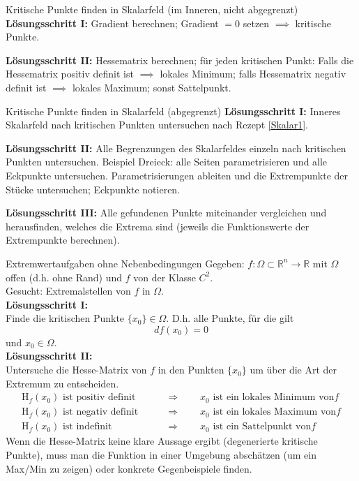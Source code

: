 \begin{Rezept}[label=Skalar1]{Kritische Punkte finden in Skalarfeld (im Inneren, nicht abgegrenzt)}{}
	\textbf{Lösungsschritt I:} Gradient berechnen; Gradient $=0$ setzen $\implies$ kritische Punkte.
	
	\textbf{Lösungsschritt II:} Hessematrix berechnen; für jeden kritischen Punkt: Falls die Hessematrix positiv definit ist $\implies$ lokales Minimum; falls Hessematrix negativ definit ist $\implies$ lokales Maximum; sonst Sattelpunkt.
\end{Rezept}

\begin{Rezept}[label=Skalar2]{Kritische Punkte finden in Skalarfeld (abgegrenzt)}{}
	\textbf{Lösungsschritt I:} Inneres Skalarfeld nach kritischen Punkten untersuchen nach Rezept \ref{Skalar1}.
	
	\textbf{Lösungsschritt II:} Alle Begrenzungen des Skalarfeldes einzeln nach kritischen Punkten untersuchen. Beispiel Dreieck: alle Seiten parametrisieren und alle Eckpunkte untersuchen. Parametrisierungen ableiten und die Extrempunkte der Stücke untersuchen; Eckpunkte notieren.
	
	\textbf{Lösungsschritt III:} Alle gefundenen Punkte miteinander vergleichen und herausfinden, welches die Extrema sind (jeweils die Funktionswerte der Extrempunkte berechnen).
\end{Rezept}

\begin{Rezept}[label=R1]{Extremwertaufgaben ohne Nebenbedingungen}{}
	Gegeben: $f:\Omega\subset \mathbb{R}^n \to \mathbb{R}$ mit $\Omega$ offen (d.h. ohne Rand) und $f$ von der Klasse $C^2$.\\
	Gesucht: Extremalstellen von $f$ in $\Omega$.\\
	\newline
	\textbf{Lösungsschritt I:}\\
	Finde die kritischen Punkte $\{x_0\} \in \Omega$. D.h. alle Punkte, für die gilt
	\begin{equation*}
	df(x_0)=0
	\end{equation*}
	und $x_0 \in \Omega$.\\
	\textbf{Lösungsschritt II:}\\
	Untersuche die Hesse-Matrix von $f$ in den Punkten $\{x_0\}$ um über die Art der Extremum zu entscheiden.
	\begin{align*}
	\text{H}_f(x_0) \text{ ist positiv definit} \qquad &\Rightarrow \qquad x_0 \text{ ist ein lokales Minimum von} f\\
	\text{H}_f(x_0) \text{ ist negativ definit} \qquad &\Rightarrow \qquad x_0 \text{ ist ein lokales Maximum von} f\\
	\text{H}_f(x_0) \text{ ist indefinit} \qquad &\Rightarrow \qquad x_0 \text{ ist ein Sattelpunkt von} f
	\end{align*}
	Wenn die Hesse-Matrix keine klare Aussage ergibt (degenerierte kritische Punkte), muss man die Funktion in einer Umgebung abschätzen (um ein Max/Min zu zeigen) oder konkrete Gegenbeispiele finden.
\end{Rezept}

